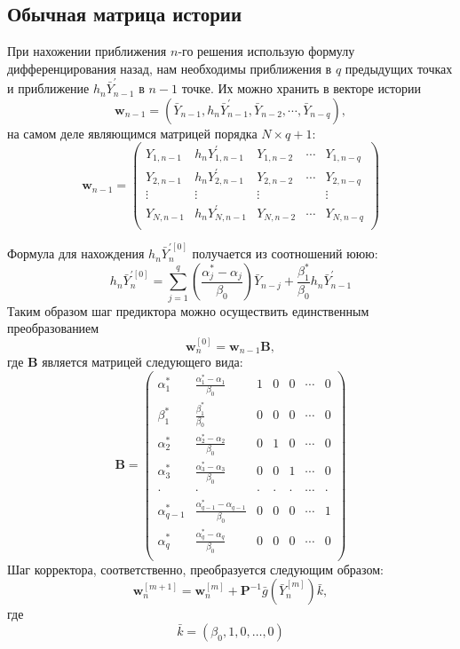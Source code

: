 \documentclass[oneside,final,14pt]{extreport}
\begin{document}
\subsection{Обычная матрица истории}
При нахожении приближения \(n\)-го решения использую формулу дифференцирования назад, нам необходимы приближения в \(q\) предыдущих точках и приближение \(h_n\bar Y_{n-1}^{'}\) в \(n-1\) точке. Их можно хранить в векторе истории
\[\mathbf w_{n-1}=(\bar Y_{n-1} , h_n\bar Y_{n-1}^{'} , \bar Y_{n-2} , \cdots , \bar Y_{n-q})
,\]
на самом деле являющимся матрицей порядка \(N\times q+1\):
\begin{equation}
\label{history}
\mathbf w_{n-1}=
\begin{pmatrix}
	Y_{1,n-1} & h_n Y_{1,n-1}^{'} & Y_{1,n-2} & \cdots &  Y_{1,n-q}\\
	Y_{2,n-1} & h_n Y_{2,n-1}^{'} & Y_{2,n-2} & \cdots &  Y_{2,n-q}\\
	\vdots & \vdots & \vdots &  &  \vdots\\
	Y_{N,n-1} & h_n Y_{N,n-1}^{'} & Y_{N,n-2} & \cdots &  Y_{N,n-q}\\
\end{pmatrix}
\end{equation}

Формула для нахождения \(h_n\bar Y_{n}^{'[0]}\) получается из соотношений ююю:
\[
h_n\bar Y_{n}^{'[0]}=\sum_{j=1}^q\left(\frac{\alpha_j^*-\alpha_j}{\beta_0}\right)\bar Y_{n-j}+\frac{\beta_1^*}{\beta_0}h_n\bar Y_{n-1}^{'}
\]
Таким образом шаг предиктора можно осуществить единственным преобразованием
\begin{equation}
\label{predictor}
\mathbf w_n^{[0]}=\mathbf w_{n-1} \mathbf B ,\end{equation}
где \(\mathbf B\) является матрицей следующего вида:
\begin{equation}
\label{B}
\mathbf{B}=
\begin{pmatrix}
\alpha_1^* & \frac{\alpha_1^*-\alpha_1}{\beta_0} & 1 & 0 & 0 & \cdots & 0\\
\beta_1^* & \frac{\beta_1^*}{\beta_0} & 0 & 0 & 0 & \cdots & 0\\
\alpha_2^* & \frac{\alpha_2^*-\alpha_2}{\beta_0} & 0 & 1 & 0 & \cdots & 0\\
\alpha_3^* & \frac{\alpha_3^*-\alpha_3}{\beta_0} & 0 & 0 & 1 & \cdots & 0\\
\cdot & \cdot & \cdot & \cdot & \cdot & \cdots & \cdot \\
\alpha_{q-1}^* & \frac{\alpha_{q-1}^*-\alpha_{q-1}}{\beta_0} & 0 & 0 & 0 & \cdots & 1\\
\alpha_q^* & \frac{\alpha_q^*-\alpha_q}{\beta_0} & 0 & 0 & 0 & \cdots & 0\\
\end{pmatrix}
\end{equation}
Шаг корректора, соответственно, преобразуется следующим образом: 
\begin{equation}
\label{corrector}
\mathbf w_n^{[m+1]}=\mathbf w_n^{[m]}+\mathbf P^{-1}\bar g(\bar Y_n^{[m]})\bar k,
\end{equation}
где
\[\bar k=(\beta_0, 1,0,\ldots,0)\]
\end{document}
